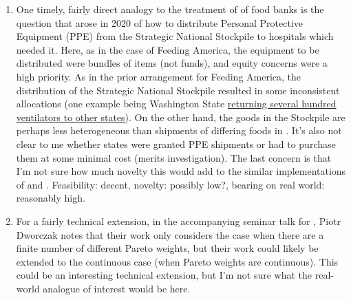 \documentclass[JEL]{AEA}
\begin{document}
\begin{enumerate}
    \item One timely, fairly direct analogy to the treatment of \cite{prendergast-2017} of food banks is the question that arose in 2020 of how to distribute Personal Protective Equipment (PPE) from the Strategic National Stockpile to hospitals which needed it. Here, as in the case of Feeding America, the equipment to be distributed were bundles of items (not funds), and equity concerns were a high priority. As in the prior arrangement for Feeding America, the distribution of the Strategic National Stockpile resulted in some inconsistent allocations (one example being Washington State \href{governor.wa.gov/news-media/we’re-together-–-washington-state-send-ventilators}{returning several hundred ventilators to other states}). On the other hand, the goods in the Stockpile are perhaps less heterogeneous than shipments of differing foods in \cite{prendergast-2017}. It's also not clear to me whether states were granted PPE shipments or had to purchase them at some minimal cost (merits investigation). The last concern is that I'm not sure how much novelty this would add to the similar implementations of \cite{prendergast-2017} and \cite{budish-2011}. Feasibility: decent, novelty: possibly low?, bearing on real world: reasonably high.
    
    \item For a fairly technical extension, in the accompanying seminar talk for \cite{akbarpour-2020}, Piotr Dworczak notes that their work only considers the case when there are a finite number of different Pareto weights, but their work could likely be extended to the continuous case (when Pareto weights are continuous). This could be an interesting technical extension, but I'm not sure what the real-world analogue of interest would be here.

    
\end{enumerate}




\end{document}
